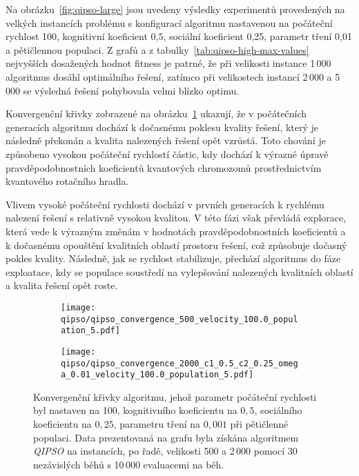 Na obrázku~\ref{fig:qipso-large} jsou uvedeny výsledky experimentů provedených na velkých instancích problému s konfigurací algoritmu nastavenou na počáteční rychlost 100, kognitivní koeficient 0,5, sociální koeficient 0,25, parametr tření 0,01 a pětičlennou populaci.
Z grafů a z tabulky~\ref{tab:qipso-high-max-values} nejvyšších dosažených hodnot fitness je patrné, že při velikosti instance 1\,000 algoritmus dosáhl optimálního řešení, zatímco při velikostech instancí 2\,000 a 5\,000 se výsledná řešení pohybovala velmi blízko optimu. 

\newpage
Konvergenční křivky zobrazené na obrázku~\ref{fig:qipso-convergence} ukazují, že v počátečních generacích algoritmu dochází k dočasnému poklesu kvality řešení, který je následně překonán a kvalita nalezených řešení opět vzrůstá.  
Toto chování je způsobeno vysokou počáteční rychlostí částic, kdy dochází k výrazné úpravě pravděpodobnostních koeficientů kvantových chromozomů prostřednictvím kvantového rotačního hradla.

Vlivem vysoké počáteční rychlosti dochází v prvních generacích k rychlému nalezení řešení s relativně vysokou kvalitou. 
V této fázi však převládá explorace, která vede k výrazným změnám v hodnotách pravděpodobnostních koeficientů a k dočasnému opouštění kvalitních oblastí prostoru řešení, což způsobuje dočasný pokles kvality. Následně, jak se rychlost stabilizuje, přechází algoritmus do fáze exploatace, kdy se populace soustředí na vylepšování nalezených kvalitních oblastí a kvalita řešení opět roste.

\begin{figure}[ht!]
    \centering
    \begin{subfigure}[b]{0.48\textwidth}
      \texttt{[image: qipso/qipso\_convergence\_500\_velocity\_100.0\_population\_5.pdf]}
    \end{subfigure}
    \hfill
    \begin{subfigure}[b]{0.48\textwidth}
        \texttt{[image: qipso/qipso\_convergence\_2000\_c1\_0.5\_c2\_0.25\_omega\_0.01\_velocity\_100.0\_population\_5.pdf]}
    \end{subfigure}
    \caption{Konvergenční křivky algoritmu, jehož parametr počáteční rychlosti byl nastaven na 100, kognitivního koeficientu na $0,5$, sociálního koeficientu na $0,25$, parametru tření na $0,001$ při pětičlenné populaci. Data prezentovaná na grafu byla získána algoritmem \emph{QIPSO} na instancích, po řadě, velikosti 500 a 2\,000 pomocí 30 nezávislých běhů s 10\,000 evaluacemi na běh.}
    \label{fig:qipso-convergence}
\end{figure}

